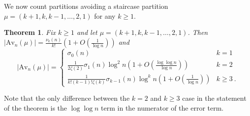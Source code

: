 \documentclass{article}
\theoremstyle{plain}
\newtheorem{theorem}{Theorem}[section]
\theoremstyle{definition}
\newcommand{\Av}{\text{Av}}
\begin{document}
%
%





We now count partitions avoiding a staircase partition $\mu=(k+1,k,k-1,\ldots, 2,1)$ for any $k\geq 1$.


\begin{theorem}\label{thm:staircase}
Fix $k\geq 1$ and let $\mu=(k+1,k,k-1,\ldots, 2,1)$.  Then $|\Av_n(\mu)| = \frac{\nu_k(n)}{k!}\left(1+O\left(\frac{1}{\log n}\right)\right)$ and 
\begin{equation}|\Av_n(\mu)| =\begin{cases}
\sigma_0(n) & k=1  \\
\frac{1}{2\zeta(2)}\sigma_{1}(n)\log^2 n\left(1+O\left(\frac{\log \log n}{\log n}\right)\right) & k=2 \\
\frac{1}{k!(k-1)!\zeta(k)}\sigma_{k-1}(n)\log^k n\left(1+O\left(\frac{1}{\log n}\right)\right) & k\geq 3  \ .
\end{cases} \label{eq:stairasymp} \end{equation}

\end{theorem}

Note that the only difference between the $k=2$ and $k\geq 3$ case in the statement of the theorem is the $\log \log n$ term in the numerator of the error term.
\end{document}
